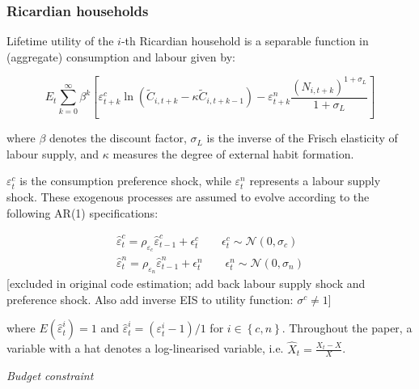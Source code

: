\documentclass[a4paper,11pt]{article}
\numberwithin{equation}{section}
\begin{document}
	
	\subsubsection{Ricardian households}
	
	Lifetime utility of the $i$-th Ricardian household is a separable function in (aggregate) consumption and labour given by:
	
	\begin{equation} \label{utility}
	E_t\sum_{k=0}^{\infty}\beta^k\left[\varepsilon_{t+k}^c \ln\left(\tilde{C}_{i,t+k}-\kappa\tilde{C}_{i,t+k-1}\right)-\varepsilon_{t+k}^n\frac{\left(N_{i,t+k}\right)^{1+\sigma_L}}{1+\sigma_L} \right]
	\end{equation}
	
	where $\beta$ denotes the discount factor, $\sigma_L$ is the inverse of the Frisch elasticity of labour supply, and $\kappa$ measures the degree of external habit formation. {\color{red}$\varepsilon_t^c$ is the consumption preference shock, while $\varepsilon_t^n$ represents a labour supply shock. These exogenous processes are assumed to evolve according to the following AR(1) specifications:
	
	\begin{equation*}
	\begin{split}
	\hat{\varepsilon}^c_t=\rho_{\varepsilon_c}\hat{\varepsilon}^c_{t-1}+\epsilon^c_t \qquad \epsilon^c_t \sim \mathcal{N}(0,\sigma_c)\\
	\hat{\varepsilon}^n_t=\rho_{\varepsilon_n}\hat{\varepsilon}^n_{t-1}+\epsilon^n_t \qquad \epsilon^n_t \sim \mathcal{N}(0,\sigma_n)
	\end{split}
	\end{equation*} [excluded in original code estimation; add back labour supply shock and preference shock. Also add inverse EIS to utility function: $\sigma^c \neq 1$]}
	
	where $E\left(\hat{\varepsilon}^i_t\right)=1$ and $\hat{\varepsilon}^i_t=\left(\varepsilon^i_t-1\right)/1$ for $i\in\left\{c,n\right\}$.  Throughout the paper, a variable with a hat denotes a log-linearised variable, i.e. $\hat{X}_t=\frac{X_t-X}{X}$.
	
	
	\vspace{8pt}
	\textit{Budget constraint}
	\vspace{8pt}
	
\end{document}

